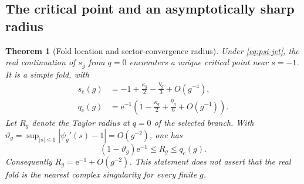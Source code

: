 \documentclass[11pt,a4paper]{article}
\numberwithin{equation}{section}
\newtheorem{theorem}{Theorem}[section]
\theoremstyle{definition}
\theoremstyle{remark}
\newcommand{\e}{\mathrm e}
\begin{document}
\subsection{The critical point and an asymptotically sharp radius}
\begin{theorem}[Fold location and sector-convergence radius]
\label{thm:radius}
Under \eqref{eq:psi-jet}, the real continuation of $s_g$ from $q=0$ encounters a unique critical point near $s=-1$. It is a simple fold, with
\begin{align}
 s_{\mathrm c}(g)&=-1+\frac{\kappa_g}{2}-\frac{\eta_g}{3}+O(g^{-4}),\label{eq:sc}\\
 q_{\mathrm c}(g)&=\e^{-1}\left(1-\frac{\kappa_g}{2}
                                      +\frac{\eta_g}{6}+O(g^{-4})\right).
 \label{eq:qc}
\end{align}
Let $R_g$ denote the Taylor radius at $q=0$ of the selected branch. With
$\vartheta_g=\sup_{|s|\leq1}|\psi_g'(s)-1|=O(g^{-2})$, one has
\begin{equation}
 (1-\vartheta_g)\e^{-1}\leq R_g\leq q_{\mathrm c}(g).
 \label{eq:radiusbounds}
\end{equation}
Consequently $R_g=\e^{-1}+O(g^{-2})$. This statement does \emph{not} assert that the real fold is the nearest complex singularity for every finite $g$.
\end{theorem}
\end{document}
